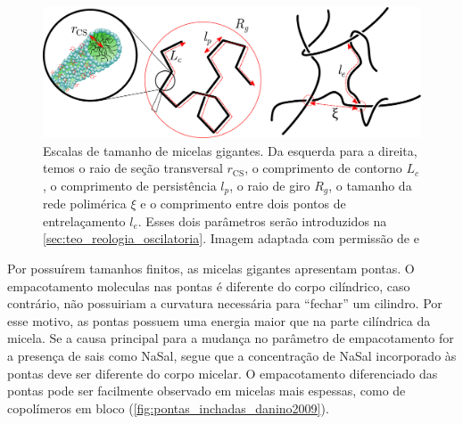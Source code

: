 		\begin{figure}[h]
			\centering
			\includegraphics[width=\textwidth]{imagens/artigos/escalas_tamanho_MG}
			\caption{Escalas de tamanho de micelas gigantes. Da esquerda para a direita, temos o raio de seção transversal \(r_\mathrm{CS}\), o comprimento de contorno \(L_c\), o comprimento de persistência \(l_p\), o raio de giro \(R_g\), o tamanho da rede polimérica \(\xi\) e o comprimento entre dois pontos de entrelaçamento \(l_e\). Esses dois parâmetros serão introduzidos na \autoref{sec:teo_reologia_oscilatoria}. Imagem adaptada com permissão de \citeauthor{Dreiss2007} e \citeauthor{Hoffmann1992a}}
			\label{fig:escalas_tamanho_mg}
		\end{figure}
		
		Por possuírem tamanhos finitos, as micelas gigantes apresentam pontas. O empacotamento moleculas nas pontas é diferente do corpo cilíndrico, caso contrário, não possuiriam a curvatura necessária para ``fechar'' um cilindro. Por esse motivo, as pontas possuem uma energia maior que na parte cilíndrica da micela.\cite{May2001a} Se a causa principal para a mudança no parâmetro de empacotamento for a presença de sais como NaSal, segue que a concentração de NaSal incorporado às pontas deve ser diferente do corpo micelar. O empacotamento diferenciado das pontas pode ser facilmente observado em micelas mais espessas, como de copolímeros em bloco (\autoref{fig:pontas_inchadas_danino2009}). 
		
